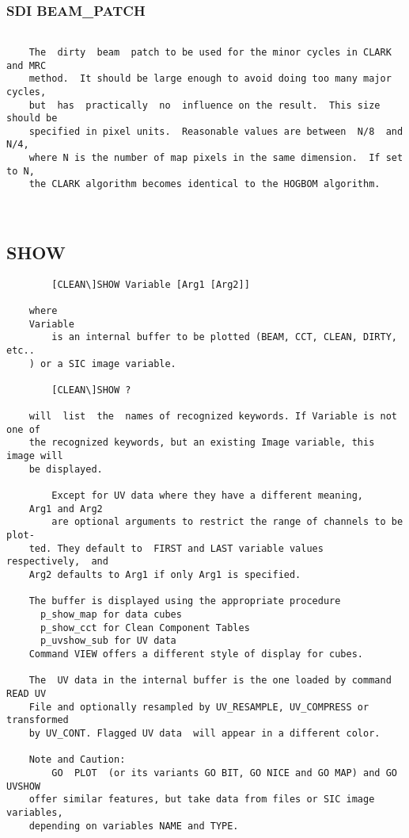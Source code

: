 \subsubsection{SDI BEAM\_PATCH}
\begin{verbatim}

    The  dirty  beam  patch to be used for the minor cycles in CLARK and MRC
    method.  It should be large enough to avoid doing too many major cycles,
    but  has  practically  no  influence on the result.  This size should be
    specified in pixel units.  Reasonable values are between  N/8  and  N/4,
    where N is the number of map pixels in the same dimension.  If set to N,
    the CLARK algorithm becomes identical to the HOGBOM algorithm.



\end{verbatim}
\subsection{SHOW}
\begin{verbatim}
        [CLEAN\]SHOW Variable [Arg1 [Arg2]]

    where
    Variable
        is an internal buffer to be plotted (BEAM, CCT, CLEAN, DIRTY,  etc..
    ) or a SIC image variable.

        [CLEAN\]SHOW ?

    will  list  the  names of recognized keywords. If Variable is not one of
    the recognized keywords, but an existing Image variable, this image will
    be displayed.

        Except for UV data where they have a different meaning,
    Arg1 and Arg2
        are optional arguments to restrict the range of channels to be plot-
    ted. They default to  FIRST and LAST variable values  respectively,  and
    Arg2 defaults to Arg1 if only Arg1 is specified.

    The buffer is displayed using the appropriate procedure
      p_show_map for data cubes
      p_show_cct for Clean Component Tables
      p_uvshow_sub for UV data
    Command VIEW offers a different style of display for cubes.

    The  UV data in the internal buffer is the one loaded by command READ UV
    File and optionally resampled by UV_RESAMPLE, UV_COMPRESS or transformed
    by UV_CONT. Flagged UV data  will appear in a different color.

    Note and Caution:
        GO  PLOT  (or its variants GO BIT, GO NICE and GO MAP) and GO UVSHOW
    offer similar features, but take data from files or SIC image variables,
    depending on variables NAME and TYPE.

\end{verbatim}

